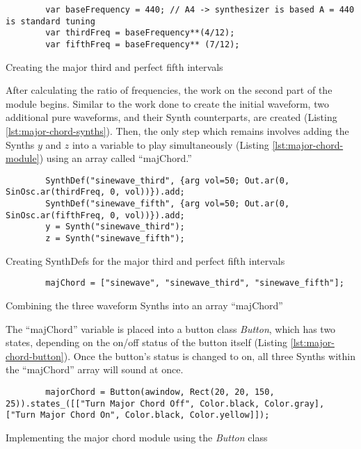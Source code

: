 \begin{listing}
	\begin{lstlisting}
		var baseFrequency = 440; // A4 -> synthesizer is based A = 440 is standard tuning
		var thirdFreq = baseFrequency**(4/12);
		var fifthFreq = baseFrequency** (7/12);
	\end{lstlisting}
	\label{lst:major-chord-creation}
	\caption{Creating the major third and perfect fifth intervals}
\end{listing}

After calculating the ratio of frequencies, the work on the second part of the module begins. Similar to the work done to create the initial waveform, two additional pure waveforms, and their Synth counterparts, are created (Listing \ref{lst:major-chord-synths}). Then, the only step which remains involves adding the Synths $y$ and $z$ into a variable to play simultaneously (Listing \ref{lst:major-chord-module}) using an array called ``majChord.''

\begin{listing}
	\begin{lstlisting}
		SynthDef("sinewave_third", {arg vol=50; Out.ar(0, SinOsc.ar(thirdFreq, 0, vol))}).add;
		SynthDef("sinewave_fifth", {arg vol=50; Out.ar(0, SinOsc.ar(fifthFreq, 0, vol))}).add;
		y = Synth("sinewave_third");
		z = Synth("sinewave_fifth");
	\end{lstlisting}
	\label{lst:major-chord-synths}
	\caption{Creating SynthDefs for the major third and perfect fifth intervals}	
\end{listing}

\begin{listing}
	\begin{lstlisting}
		majChord = ["sinewave", "sinewave_third", "sinewave_fifth"];
	\end{lstlisting}
	\label{lst:major-chord-module}
	\caption{Combining the three waveform Synths into an array ``majChord''}
\end{listing}

The ``majChord'' variable is placed into a button class \textit{Button}, which has two states, depending on the on/off status of the button itself (Listing \ref{lst:major-chord-button}). Once the button's status is changed to on, all three Synths within the ``majChord'' array will sound at once.

\begin{listing}
	\begin{lstlisting}
		majorChord = Button(awindow, Rect(20, 20, 150, 25)).states_([["Turn Major Chord Off", Color.black, Color.gray], ["Turn Major Chord On", Color.black, Color.yellow]]);	
	\end{lstlisting}
	\label{lst:major-chord-button}
	\caption{Implementing the major chord module using the \textit{Button} class}
\end{listing}


